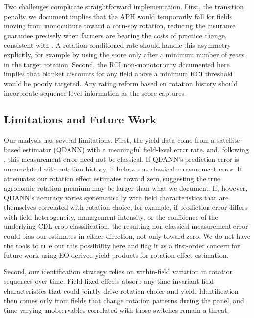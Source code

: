 \documentclass[12pt,letterpaper]{article}
\theoremstyle{remark}
\theoremstyle{remark}
\theoremstyle{plain}
\theoremstyle{definition}
\begin{document}
Two challenges complicate straightforward implementation. First, the transition penalty we document implies that the APH would temporarily fall for fields moving from monoculture toward a corn-soy rotation, reducing the insurance guarantee precisely when farmers are bearing the costs of practice change, consistent with \citet{Connor2022}. A rotation-conditioned rate should handle this asymmetry explicitly, for example by using the score only after a minimum number of years in the target rotation. Second, the RCI non-monotonicity documented here implies that blanket discounts for any field above a minimum RCI threshold would be poorly targeted. Any rating reform based on rotation history should incorporate sequence-level information as the score captures.
 
\subsection{\label{subsec:limitations}Limitations and Future Work}
 
Our analysis has several limitations. First, the yield data come from a satellite-based estimator (QDANN) with a meaningful field-level error rate, and, following \citet{Benami2026}, this measurement error need not be classical. If QDANN's prediction error is uncorrelated with rotation history, it behaves as classical measurement error. It attenuates our rotation effect estimates toward zero, suggesting the true agronomic rotation premium may be larger than what we document. If, however, QDANN's accuracy varies systematically with field characteristics that are themselves correlated with rotation choice, for example, if prediction error differs with field heterogeneity, management intensity, or the confidence of the underlying CDL crop classification, the resulting non-classical measurement error could bias our estimates in either direction, not only toward zero. We do not have the tools to rule out this possibility here and flag it as a first-order concern for future work using EO-derived yield products for rotation-effect estimation.

Second, our identification strategy relies on within-field variation in rotation sequences over time. Field fixed effects absorb any time-invariant field characteristics that could jointly drive rotation choice and yield. Identification then comes only from fields that change rotation patterns during the panel, and time-varying unobservables correlated with those switches remain a threat.
 
\end{document}
